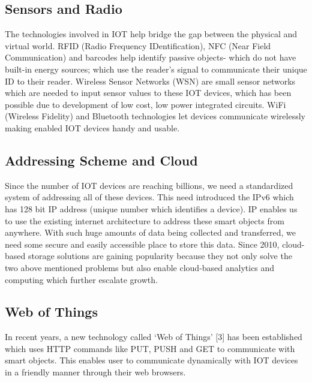 \documentclass[conference]{IEEEtran}
\begin{document}
\subsection{Sensors and Radio}
The technologies involved in IOT help bridge the gap between the physical and virtual world. RFID (Radio Frequency IDentification), NFC (Near Field Communication) and barcodes help identify passive objects- which do not have built-in energy sources; which use the reader’s signal to communicate their unique ID to their reader.  Wireless Sensor Networks (WSN) are small sensor networks which are needed to input sensor values to these IOT devices, which has been possible due to development of low cost, low power integrated circuits. WiFi (Wireless Fidelity) and Bluetooth technologies let devices communicate wirelessly making enabled IOT devices handy and usable. 
\subsection{Addressing Scheme and Cloud}
Since the number of IOT devices are reaching billions, we need a standardized system of addressing all of these devices. This need introduced the IPv6 which has 128 bit IP address (unique number which identifies a device). IP enables us to use the existing internet architecture to address these smart objects from anywhere. With such huge amounts of data being collected and transferred, we need some secure and easily accessible place to store this data. Since 2010, cloud-based storage solutions are gaining popularity because they not only solve the two above mentioned problems but also enable cloud-based analytics and computing which further escalate growth.

\subsection{Web of Things}
In recent years, a new technology called ‘Web of Things’ [3] has been established which uses HTTP commands like PUT, PUSH and GET to communicate with smart objects. This enables user to communicate dynamically with IOT devices in a friendly manner through their web browsers. 
\end{document}

